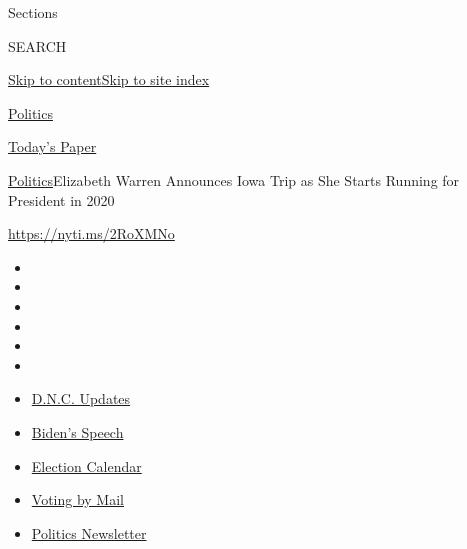 Sections

SEARCH

\protect\hyperlink{site-content}{Skip to
content}\protect\hyperlink{site-index}{Skip to site index}

\href{https://www.nytimes3xbfgragh.onion/section/politics}{Politics}

\href{https://myaccount.nytimes3xbfgragh.onion/auth/login?response_type=cookie\&client_id=vi}{}

\href{https://www.nytimes3xbfgragh.onion/section/todayspaper}{Today's
Paper}

\href{/section/politics}{Politics}\textbar{}Elizabeth Warren Announces
Iowa Trip as She Starts Running for President in 2020

\url{https://nyti.ms/2RoXMNo}

\begin{itemize}
\item
\item
\item
\item
\item
\item
\end{itemize}

\begin{itemize}
\item
  \href{https://www.nytimes3xbfgragh.onion/live/2020/08/20/us/dnc-convention-election?action=click\&pgtype=Article\&state=default\&region=TOP_BANNER\&context=storylines_menu}{D.N.C.
  Updates}
\item
  \href{https://www.nytimes3xbfgragh.onion/2020/08/20/us/politics/biden-presidential-nomination-dnc.html?action=click\&pgtype=Article\&state=default\&region=TOP_BANNER\&context=storylines_menu}{Biden's
  Speech}
\item
  \href{https://www.nytimes3xbfgragh.onion/interactive/2019/us/elections/2020-presidential-election-calendar.html?action=click\&pgtype=Article\&state=default\&region=TOP_BANNER\&context=storylines_menu}{Election
  Calendar}
\item
  \href{https://www.nytimes3xbfgragh.onion/interactive/2020/08/11/us/politics/vote-by-mail-us-states.html?action=click\&pgtype=Article\&state=default\&region=TOP_BANNER\&context=storylines_menu}{Voting
  by Mail}
\item
  \href{https://www.nytimes3xbfgragh.onion/newsletters/politics?action=click\&pgtype=Article\&state=default\&region=TOP_BANNER\&context=storylines_menu}{Politics
  Newsletter}
\end{itemize}

